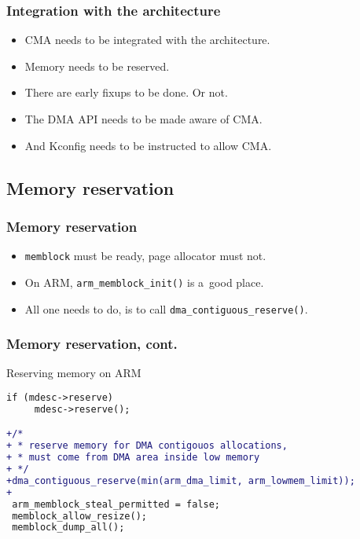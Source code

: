 
\begin{frame}
  \frametitle{Integration with the architecture}

  \begin{itemize}
  \item CMA needs to be integrated with the architecture.
  \item Memory needs to be reserved.
  \item There are early fixups to be done. {\footnotesize Or not.}
  \item The DMA API needs to be made aware of CMA.
  \item And Kconfig needs to be instructed to allow CMA.
  \end{itemize}
\end{frame}

\subsection{Memory reservation}

\begin{frame}
  \frametitle{Memory reservation}

  \begin{itemize}
  \item \lstinline|memblock| must be ready, page allocator must not.
  \item On ARM, \lstinline|arm_memblock_init()| is a~good place.
  \item All one needs to do, is to call
    \lstinline|dma_contiguous_reserve()|.
  \end{itemize}
\end{frame}

\begin{frame}[fragile]
  \frametitle{Memory reservation, cont.}

  \begin{block}{Reserving memory on ARM}
\begin{lstlisting}[language=diff]
 if (mdesc->reserve)
     mdesc->reserve();

+/*
+ * reserve memory for DMA contigouos allocations,
+ * must come from DMA area inside low memory
+ */
+dma_contiguous_reserve(min(arm_dma_limit, arm_lowmem_limit));
+
 arm_memblock_steal_permitted = false;
 memblock_allow_resize();
 memblock_dump_all();
\end{lstlisting}
  \end{block}
\end{frame}

